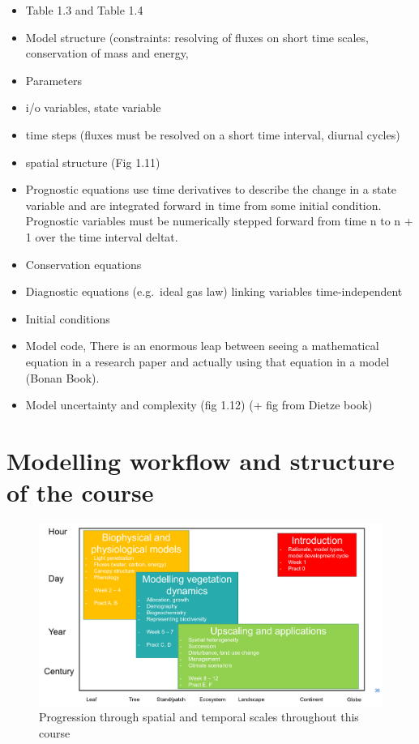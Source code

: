 \documentclass[
  oneside]{book}
\providecommand{\tightlist}{%
  \setlength{\itemsep}{0pt}\setlength{\parskip}{0pt}}
\begin{document}
\begin{itemize}
\tightlist
\item
  Table 1.3 and Table 1.4
\item
  Model structure (constraints: resolving of fluxes on short time scales, conservation of mass and energy,
\item
  Parameters
\item
  i/o variables, state variable
\item
  time steps (fluxes must be resolved on a short time interval, diurnal cycles)
\item
  spatial structure (Fig 1.11)
\item
  Prognostic equations use time derivatives to describe the change in a state variable and are integrated forward in time from some initial condition. Prognostic variables must be numerically stepped forward from time n to n + 1 over the time interval deltat.
\item
  Conservation equations
\item
  Diagnostic equations (e.g.~ideal gas law) linking variables time-independent
\item
  Initial conditions
\item
  Model code, There is an enormous leap between seeing a mathematical equation in a research paper and actually using that equation in a model (Bonan Book).
\item
  Model uncertainty and complexity (fig 1.12) (+ fig from Dietze book)
\end{itemize}

\hypertarget{modelling-workflow-and-structure-of-the-course}{%
\section{Modelling workflow and structure of the course}\label{modelling-workflow-and-structure-of-the-course}}

\begin{figure}

{\centering \includegraphics[width=0.8\linewidth]{figures/chap1/course_overview} 

}

\caption{Progression through spatial and temporal scales throughout this course}\label{fig:f12}
\end{figure}
\end{document}

